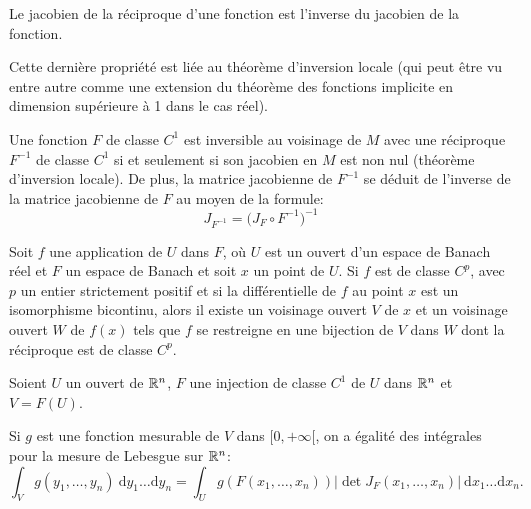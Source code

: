\medskip
Le jacobien de la réciproque d'une fonction est l'inverse du jacobien de la fonction.

\medskip
{}
Cette dernière propriété est liée au théorème d'inversion locale (qui peut être vu entre autre
comme une extension du théorème des fonctions implicite en dimension supérieure à 1 dans le cas réel).


Une fonction $F$ de classe $C^1$ est inversible au voisinage de $M$ avec une réciproque $F^{-1}$ 
de classe $C^1$ si et seulement si son jacobien en $M$ est non nul (théorème d'inversion locale). 
De plus, la matrice jacobienne de $F^{-1}$ se déduit de l'inverse de la matrice jacobienne de $F$ 
au moyen de la formule:
\begin{equation}J_{F^{-1}} = \bigl( J_F \circ F^{-1} \bigr)^{-1}\end{equation}


\begin{theoreme}
Soit $f$ une application de $U$ dans $F$, où $U$ est un ouvert d'un espace de Banach réel et 
$F$ un espace de Banach et soit $x$ un point de $U$.
Si $f$ est de classe $C^p$, avec $p$ un entier strictement positif et si la différentielle de $f$ au point 
$x$ est un isomorphisme bicontinu, alors il existe un voisinage ouvert $V$ de $x$ et un voisinage ouvert 
$W$ de $f(x)$ tels que $f$ se restreigne en une bijection de $V$ dans $W$ dont la réciproque est de 
classe $C^p$.
\end{theoreme}

\medskip
{}

\medskip
\begin{theoreme}

Soient $U$ un ouvert de $\mathbb R^n$, $F$ une injection de classe $C^1$ de $U$ dans $\mathbb R^n$ et $V=F(U)$.

Si $g$ est une fonction mesurable de $V$ dans $[0,+\infty[$, on a égalité des intégrales pour la mesure 
de Lebesgue sur $\mathbb R^n$:
\begin{equation}   \int_V g(y_1,\ldots,y_n)~\mathrm dy_1\ldots\mathrm dy_n = \int_U g\left(F\left(x_1,\ldots,x_n\right)\right) \left|\det J_F(x_1,\ldots,x_n)\right|~\mathrm dx_1\ldots\mathrm dx_n.
\end{equation}
\end{theoreme}

